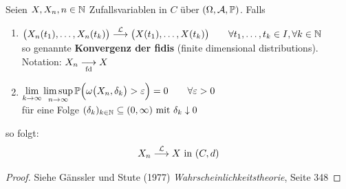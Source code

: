 \begin{satz}\label{satz7.9}
Seien $X,X_n,n\in\N$ Zufallsvariablen in $C$ über $(\Omega,\A,\P)$. Falls
\begin{enumerate}[label=(\arabic*)]
\item $\begin{aligned}
\big(X_n(t_1),\ldots,X_n(t_k)\big)\stackrel{\L}{\longrightarrow}\big(X(t_1),\ldots,X(t_k)\big)
\qquad\forall t_1,\ldots,t_k\in I,\forall k\in\N
\end{aligned}$\\
so genannte \textbf{Konvergenz der fidis} (finite dimensional distributions).\\
Notation: $X_n\stackrelnew{\text{fd}}{}{\longrightarrow} X$
\item $\begin{aligned}
\lim\limits_{k\to\infty}\limsup\limits_{n\to\infty}\P\Big(\omega\big(X_n,\delta_k\big)>\varepsilon\Big)=0\qquad\forall\varepsilon>0
\end{aligned}$\\
für eine Folge $(\delta_k)_{k\in\N}\subseteq(0,\infty)\mit\delta_k\downarrow0$
\end{enumerate}
so folgt:
\begin{align*}
X_n\stackrel{\L}{\longrightarrow}X\text{ in }(C,d)
\end{align*}
\end{satz}
\begin{proof}
Siehe Gänssler und Stute (1977) \textit{Wahrscheinlichkeitstheorie}, Seite 348
\end{proof}

